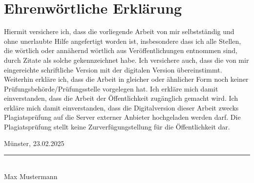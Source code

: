  \section*{Ehrenwörtliche Erklärung}
    Hiermit versichere ich, dass die vorliegende Arbeit von mir selbstständig und ohne unerlaubte Hilfe angefertigt worden ist, insbesondere dass ich alle Stellen, die wörtlich oder
    annähernd wörtlich aus Veröffentlichungen entnommen sind, durch Zitate als solche gekennzeichnet habe. Ich versichere auch, dass die von mir eingereichte schriftliche Version
    mit der digitalen Version übereinstimmt. Weiterhin erkläre ich, dass die Arbeit in gleicher
    oder ähnlicher Form noch keiner Prüfungsbehörde/Prüfungsstelle vorgelegen hat. Ich erkläre mich damit einverstanden, dass die Arbeit der Öffentlichkeit zugänglich gemacht
    wird. Ich erkläre mich damit einverstanden, dass die Digitalversion dieser Arbeit zwecks
    Plagiatsprüfung auf die Server externer Anbieter hochgeladen werden darf. Die Plagiatsprüfung stellt keine Zurverfügungstellung für die Öffentlichkeit dar.
    
    \vspace{1cm}
    \noindent
    Münster, 23.02.2025\\
    \vspace{1cm}

    
    \noindent\rule{5cm}{0.4pt}\\
    Max Mustermann